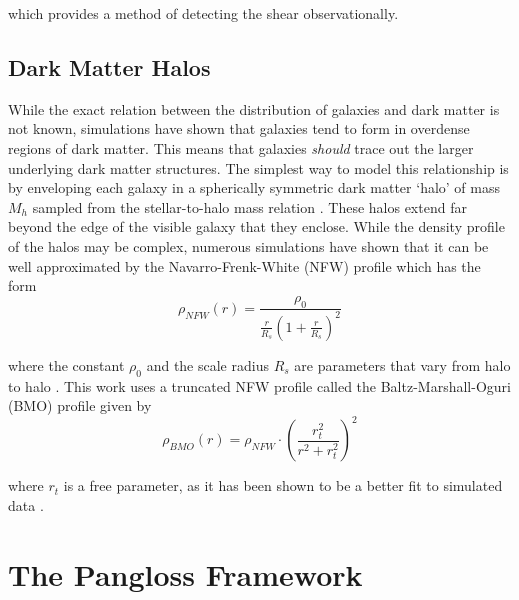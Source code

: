 \documentclass[%
 reprint,
 amsmath,amssymb,
 aps,nofootinbib
]{revtex4-1}
\begin{document}
 \noindent which provides a method of detecting the shear observationally.

\subsection*{Dark Matter Halos}

While the exact relation between the distribution of galaxies and dark matter is not known, simulations have shown that galaxies tend to form in overdense regions of dark matter. This means that galaxies \textit{should} trace out the larger underlying dark matter structures. The simplest way to model this relationship is by enveloping each galaxy in a spherically symmetric dark matter `halo' of mass $M_h$ sampled from the stellar-to-halo mass relation \cite{smhr}. These halos extend far beyond the edge of the visible galaxy that they enclose. While the density profile of the halos may be complex, numerous simulations have shown that it can be well approximated by the Navarro-Frenk-White (NFW) profile which has the form
\begin{equation}\label{nfw_profile}
\rho_{NFW}(r)=\frac{\rho_0}{\frac{r}{R_s}\left(1+\frac{r}{R_s}\right)^2}
\end{equation}

\noindent where the constant $\rho_0$ and the scale radius $R_s$ are parameters that vary from halo to halo \cite{nfw}. This work uses a truncated NFW profile called the Baltz-Marshall-Oguri (BMO) profile given by
\begin{equation}\label{bmo_profile}
\rho_{BMO}(r)=\rho_{NFW}\cdot\left(\frac{r_t^2}{r^2+r_t^2}\right)^2
\end{equation}

\noindent where $r_t$ is a free parameter, as it has been shown to be a better fit to simulated data \cite{nfw_bmo}.

\section{The Pangloss Framework}
\end{document}
